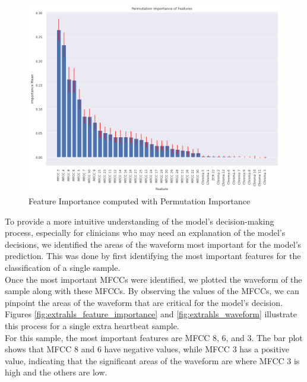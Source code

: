\begin{figure}[h]
    \centering
    \includegraphics[width=\columnwidth]{../images/permutation_feature_importance.png}
    \caption{Feature Importance computed with Permutation Importance}
    \label{fig:permutation_feature_importance}
\end{figure}
\noindent
To provide a more intuitive understanding of the model's decision-making process, especially for clinicians who may need an explanation of the model's decisions,
we identified the areas of the waveform most important for the model's prediction. This was done by first identifying the most important features
for the classification of a single sample. \\
Once the most important MFCCs were identified, we plotted the waveform of the sample along with these MFCCs.
By observing the values of the MFCCs, we can pinpoint the areas of the waveform that are critical for the model's decision.
Figures \ref{fig:extrahls_feature_importance} and \ref{fig:extrahls_waveform} illustrate this process for a single extra heartbeat sample. \\
For this sample, the most important features are MFCC 8, 6, and 3. The bar plot shows that MFCC 8 and 6 have negative values,
while MFCC 3 has a positive value, indicating that the significant areas of the waveform are where MFCC 3 is high and the others are low.

